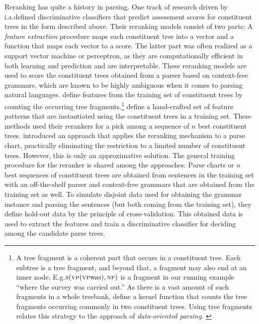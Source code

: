 \documentclass[../../document.tex]{subfiles}
\begin{document}
    Reranking has quite a history in parsing.
    One track of research driven by \citet{collins2001convolution,shen2003svm,collins05,huang2008forest} i.a.\@ defined discriminative classifiers that predict assessment scores for constituent trees in the form described above.
    Their reranking models consist of two parts:
        A \emph{feature extraction} procedure maps each constituent tree into a vector and a function that maps each vector to a score.
    The latter part was often realized as a support vector machine or perceptron, as they are computationally efficient in both learning and prediction and are interpretable.
    These reranking models are used to score the constituent trees obtained from a parser based on context-free grammars, which are known to be highly ambiguous when it comes to parsing natural languages.
    \citet{collins2001convolution, shen2003svm} define features from the training set of constituent trees by counting the occurring tree fragments.\footnote{
        A tree fragment is a coherent part that occurs in a constituent tree.
        Each subtree is a tree fragment, and beyond that, a fragment may also end at an inner node.
        E.g.\@ \(\textsc{s} (\textsc{vp} (\textsc{vp} \text{was}), \textsc{np})\) is a fragment in our running example ``where the survey was carried out.''
        As there is a vast amount of such fragments in a whole treebank, \citet{collins2001convolution} define a kernel function that counts the tree fragments occurring commonly in two constituent trees.
        Using tree fragments relates this strategy to the approach of \emph{data-oriented parsing}. \citep{Bod92}
    }
    \citet{collins05,charniak2005coarse} define a hand-crafted set of feature patterns that are instantiated using the constituent trees in a training set.
    These methods used their rerankers for a pick among a sequence of \(n\) best constituent trees.
    \citet{huang2008forest} introduced an approach that applies the reranking mechanism to a parse chart, practically eliminating the restriction to a limited number of constituent trees.
    However, this is only an approximative solution.
    The general training procedure for the reranker is shared among the approaches:
        Parse charts or \(n\) best sequences of constituent trees are obtained from sentences in the training set with an off-the-shelf parser and context-free grammars that are obtained from the training set as well.
        To simulate disjoint data used for obtaining the grammar instance and parsing the sentences (but both coming from the training set), they define hold-out data by the principle of cross-validation.
        This obtained data is used to extract the features and train a discriminative classifier for deciding among the candidate parse trees.
        
\end{document}
